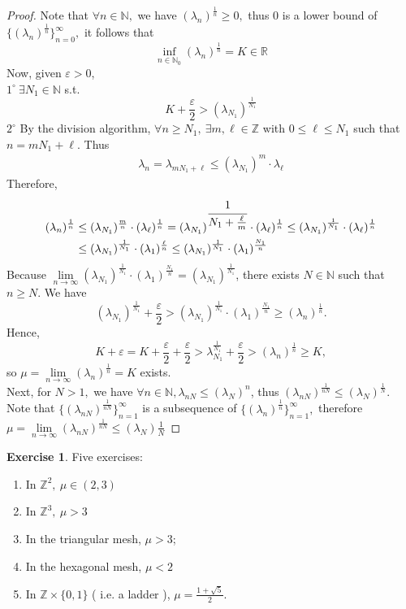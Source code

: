 \documentclass[12pt,a4paper]{report}
\theoremstyle{definition}
\newtheorem{ex}{Exercise}
\begin{document}
	\begin{proof} Note that $\forall n\in \mathbb{N},$ we have $(\lambda_n)^{\frac{1}{n}}\geq 0,$ thus $0$ is a lower bound of $\{(\lambda_n)^{\frac{1}{n}}\}_{n=0}^\infty,$ it follows that 
	\[
	\inf_{n\in\mathbb{N}_0}(\lambda_n)^{\frac{1}{n}}=K\in\mathbb{R}
	\]
	Now, given $\varepsilon>0$,\\ 
	$1^{\circ}\ \exists N_1\in\mathbb{N}$ s.t.\[K+\frac{\varepsilon}{2}>(\lambda_{N_1})^\frac{1}{N_1}\]
	$2^{\circ}$ By the division algorithm, $\forall n\geq N_1,\ \exists m,\ell \in \mathbb{Z}$ with $0\leq \ell\leq N_1$ such that $n=mN_1+\ell$. Thus
	\begin{align*}
	\lambda_n=\lambda_{mN_1+\ell}\leq (\lambda_{N_1})^m\cdot \lambda_\ell
	\end{align*}
	Therefore,
	\begin{align*}
	(\lambda_n)^{\frac{1}{n}}&\leq (\lambda_{N_1})^{\frac{m}{n}}\cdot (\lambda_\ell)^{\frac{1}{n}}=(\lambda_{N_1})^{\cfrac{1}{N_1+\frac{\ell}{m}}}\cdot (\lambda_\ell)^\frac{1}{n}\leq (\lambda_{N_1})^\frac{1}{N_1}\cdot (\lambda_\ell)^\frac{1}{n}\\
	&\leq (\lambda_{N_1})^\frac{1}{N_1}\cdot (\lambda_1)^\frac{\ell}{n}\leq (\lambda_{N_1})^\frac{1}{N_1}\cdot (\lambda_1)^\frac{N_1}{n}
	\end{align*}
	Because $\lim\limits_{n\to\infty}(\lambda_{N_1})^{\frac{1}{N_1}}\cdot (\lambda_1)^{\frac{N_1}{n}}=(\lambda_{N_1})^\frac{1}{N_1}$, there exists $N\in\mathbb{N}$ such that $n\geq N$. We have
	\[
	(\lambda_{N_1})^\frac{1}{N_1}+\frac{\varepsilon}{2}>(\lambda_{N_1})^\frac{1}{N_1}\cdot (\lambda_1)^{\frac{N_1}{n}}\geq (\lambda_n)^{\frac{1}{n}}.
	\]
	Hence, 
	\[
	K+\varepsilon=K+\frac{\varepsilon}{2}+\frac{\varepsilon}{2}>\lambda_{N_1}^{\frac{1}{N_1}}+\frac{\varepsilon}{2}>(\lambda_n)^{\frac{1}{n}}\geq K,
	\]
	so $\mu=\lim\limits_{n\to\infty}(\lambda_n)^\frac{1}{n}=K$ exists.\\
	Next, for $N>1,$ we have $\forall n\in \mathbb{N}, \lambda_{nN}\leq (\lambda_N)^n$, thus $(\lambda_{nN})^\frac{1}{nN}\leq (\lambda_N)^\frac{1}{N}.$ Note that $\{(\lambda_{nN})^{\frac{1}{nN}}\}_{n=1}^{\infty}$ is a subsequence of $\{(\lambda_{n})^{\frac{1}{n}}\}_{n=1}^{\infty},$ therefore $\mu=\lim\limits_{n\to\infty}(\lambda_{nN})^\frac{1}{nN}\leq (\lambda_N)\frac{1}{N}$
	\end{proof}
	\begin{ex} Five exercises:
	\begin{enumerate}
		\item In $\mathbb{Z}^2,\ \mu\in (2,3)$
		\item In $\mathbb{Z}^3,\ \mu>3$
		\item In the triangular mesh, $\mu>3$;
		\item In the hexagonal mesh, $\mu<2$
		\item In $\mathbb{Z}\times \{0,1\}$ ( i.e. a ladder ), $\mu=\frac{1+\sqrt{5}}{2}.$
	\end{enumerate} 
	\end{ex}
\end{document}
